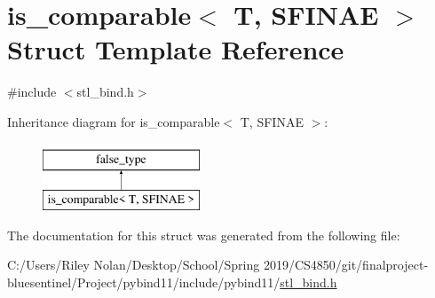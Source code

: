 \hypertarget{structis__comparable}{}\section{is\+\_\+comparable$<$ T, S\+F\+I\+N\+AE $>$ Struct Template Reference}
\label{structis__comparable}


{\ttfamily \#include $<$stl\+\_\+bind.\+h$>$}

Inheritance diagram for is\+\_\+comparable$<$ T, S\+F\+I\+N\+AE $>$\+:\begin{figure}[H]
\begin{center}
\leavevmode
\includegraphics[height=2.000000cm]{structis__comparable}
\end{center}
\end{figure}


The documentation for this struct was generated from the following file\+:\begin{DoxyCompactItemize}
\item 
C\+:/\+Users/\+Riley Nolan/\+Desktop/\+School/\+Spring 2019/\+C\+S4850/git/finalproject-\/bluesentinel/\+Project/pybind11/include/pybind11/\mbox{\hyperlink{stl__bind_8h}{stl\+\_\+bind.\+h}}\end{DoxyCompactItemize}
